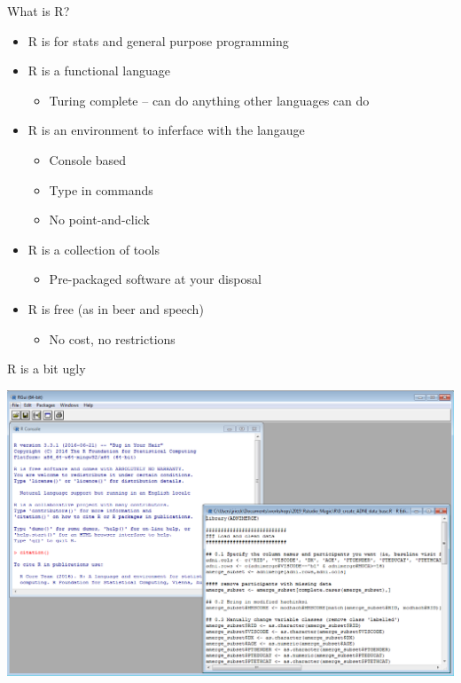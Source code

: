 \documentclass[
  ignorenonframetext,
]{beamer}
\providecommand{\tightlist}{%
  \setlength{\itemsep}{0pt}\setlength{\parskip}{0pt}}
\begin{document}
\begin{frame}{What is R?}
\protect\hypertarget{what-is-r}{}

\begin{itemize}[<+->]
\tightlist
\item
  R is for stats and general purpose programming
\item
  R is a functional language

  \begin{itemize}[<+->]
  \tightlist
  \item
    Turing complete -- can do anything other languages can do
  \end{itemize}
\item
  R is an environment to inferface with the langauge

  \begin{itemize}[<+->]
  \tightlist
  \item
    Console based
  \item
    Type in commands
  \item
    No point-and-click
  \end{itemize}
\item
  R is a collection of tools

  \begin{itemize}[<+->]
  \tightlist
  \item
    Pre-packaged software at your disposal
  \end{itemize}
\item
  R is free (as in beer and speech)

  \begin{itemize}[<+->]
  \tightlist
  \item
    No cost, no restrictions
  \end{itemize}
\end{itemize}

\end{frame}

\begin{frame}{R is a bit ugly}
\protect\hypertarget{r-is-a-bit-ugly}{}

\includegraphics{../external/images/intro_rgui.PNG}

\end{frame}
\end{document}
